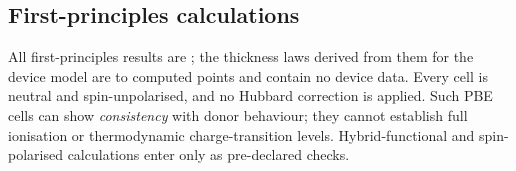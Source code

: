 \subsection{First-principles calculations}
\label{sec:m-dft}

All first-principles results are ; the thickness laws derived from them for the device model are
 to computed points and contain no device data. %
Every cell is neutral and spin-unpolarised, and no Hubbard correction is applied. %
Such PBE cells can show \emph{consistency} with donor behaviour; they cannot establish full ionisation or
thermodynamic charge-transition levels. %
Hybrid-functional and spin-polarised calculations enter only as pre-declared checks.


